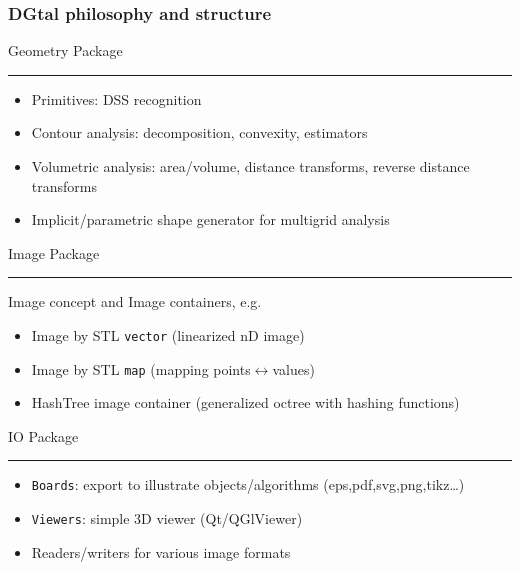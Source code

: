 \documentclass[8pt]{beamer}
\newcommand{\HH}{ \vspace{0.5pt}\hrule}
\begin{document}
\begin{frame}
  \frametitle{DGtal philosophy and structure}
    \begin{alertblock}{\centering Geometry Package\HH}
    \small
    \begin{itemize}
    \item Primitives: DSS recognition
    \item Contour analysis: decomposition, convexity, estimators
    \item Volumetric analysis: area/volume, distance transforms,
      reverse distance transforms
    \item Implicit/parametric shape generator for multigrid analysis
    \end{itemize}
  \end{alertblock}
  
  \begin{alertblock}{\centering Image Package\HH}
    Image concept and Image containers, e.g.
    \begin{itemize}
    \item Image by STL \texttt{vector} (linearized nD image)
    \item Image by STL \texttt{map} (mapping points$\leftrightarrow$values)
    \item HashTree image container (generalized octree with hashing functions)
    \end{itemize}
  \end{alertblock}
  

  \begin{alertblock}{\centering IO Package\HH}
    \small
    \begin{itemize}
    \item \texttt{Boards}: export to illustrate objects/algorithms (eps,pdf,svg,png,tikz\ldots)  
    \item \texttt{Viewers}:  simple 3D viewer (Qt/QGlViewer)
    \item Readers/writers for various image formats
    \end{itemize}
  \end{alertblock}
\end{frame}
\end{document}

